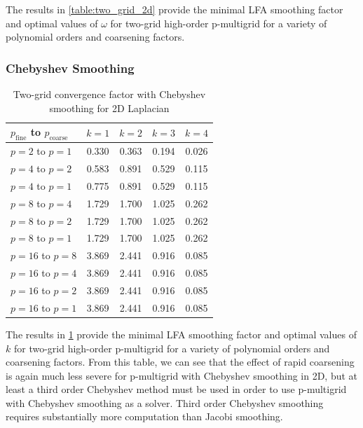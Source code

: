 \documentclass[review]{siamart190516}
\begin{document}
The results in \cref{table:two_grid_2d} provide the minimal LFA smoothing factor and optimal values of $\omega$ for two-grid high-order p-multigrid for a variety of polynomial orders and coarsening factors.

\subsubsection{Chebyshev Smoothing}

\begin{table}[ht!]
\begin{center}
\begin{tabular}{l c c c c}
  \toprule
  $p_{\text{fine}}$ to $p_{\text{coarse}}$  &  $k = 1$   &  $k = 2$   &  $k = 3$   &  $k = 4$   \\
  \toprule
  $p = 2$ to $p = 1$   &  0.330  &  0.363  &  0.194  &  0.026  \\
  \midrule
  $p = 4$ to $p = 2$   &  0.583  &  0.891  &  0.529  &  0.115  \\
  $p = 4$ to $p = 1$   &  0.775  &  0.891  &  0.529  &  0.115  \\
  \midrule
  $p = 8$ to $p = 4$   &  1.729  &  1.700  &  1.025  &  0.262  \\
  $p = 8$ to $p = 2$   &  1.729  &  1.700  &  1.025  &  0.262  \\
  $p = 8$ to $p = 1$   &  1.729  &  1.700  &  1.025  &  0.262  \\
  \midrule
  $p = 16$ to $p = 8$  &  3.869  &  2.441  &  0.916  &  0.085  \\
  $p = 16$ to $p = 4$  &  3.869  &  2.441  &  0.916  &  0.085  \\
  $p = 16$ to $p = 2$  &  3.869  &  2.441  &  0.916  &  0.085  \\
  $p = 16$ to $p = 1$  &  3.869  &  2.441  &  0.916  &  0.085  \\
  \bottomrule
\end{tabular}
\end{center}
\caption{Two-grid convergence factor with Chebyshev smoothing for 2D Laplacian}
\label{table:two_grid_2d_chebyshev}
\end{table}

The results in \cref{table:two_grid_2d_chebyshev} provide the minimal LFA smoothing factor and optimal values of $k$ for two-grid high-order p-multigrid for a variety of polynomial orders and coarsening factors.
From this table, we can see that the effect of rapid coarsening is again much less severe for p-multigrid with Chebyshev smoothing in 2D, but at least a third order Chebyshev method must be used in order to use p-multigrid with Chebyshev smoothing as a solver.
Third order Chebyshev smoothing requires substantially more computation than Jacobi smoothing.
\end{document}
